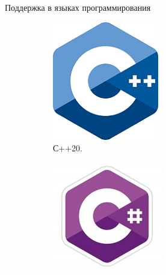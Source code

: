 \begin{frame}{Поддержка в языках программирования}
	
	\begin{figure}
	\centering
	\hfill
	\begin{subfigure}[b]{0.25\linewidth}
		\includegraphics[width=\linewidth]{images/cpp.png}
		\caption{С++20.}
	\end{subfigure}
	\hfill
	\begin{subfigure}[b]{0.30\linewidth}
		\includegraphics[width=\linewidth]{images/csharp.jpg} 

\end{subfigure}
\end{figure}
\end{frame}
